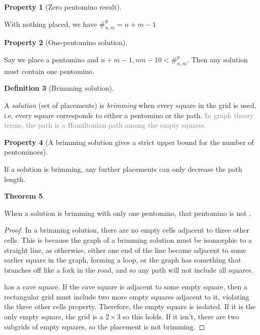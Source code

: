 \documentclass{article}
\newcommand{\pentU}{\smash{\colorbox{colorU!50}{U}}}
\theoremstyle{definition}%
\newtheorem{theorem}{Theorem}[section]
\newtheorem{definition}[theorem]{Definition}
\newtheorem{property}[theorem]{Property}
\newcommand{\minordetail}[1]{\textcolor{gray}{#1}}
\newcommand{\newterm}[1]{\textit{#1}}
\begin{document}
\begin{property}[Zero pentomino result]
\label{prop:zeroplace}

With nothing placed, we have $\#^{\emptyset}_{n, m} = n + m - 1$
\end{property}

\begin{property}[One-pentomino solution]
\label{prop:oneplace}

Say we place a pentomino and $n + m - 1, nm - 10 < \#^p_{n, m}$. Then any solution must contain one pentomino.
\end{property}

\begin{definition}[Brimming solution]
\label{def:brimming}

A \newterm{solution} (set of placements) is \newterm{brimming} when every square in the grid is used, i.e, every square corresponds to either a pentomino or the path. \minordetail{In graph theory terms, the path is a Hamiltonian path among the empty squares.}
\end{definition}

\begin{property}[A brimming solution gives a strict upper bound for the number of pentominoes]
\label{prop:brimmax}

If a solution is brimming, any further placements can only decrease the path length.
\end{property}

\begin{theorem}
\label{th:brimming1u}

When a solution is brimming with only one pentomino, that pentomino is not \pentU.
\end{theorem}

\begin{proof}
In a brimming solution, there are no empty cells adjacent to three other cells. This is because the graph of a brimming solution must be isomorphic to a straight line, as otherwise, either one end of the line became adjacent to some earlier square in the graph, forming a loop, or the graph has something that branches off like a fork in the road, and so any path will not include all squares.

\pentU{} has a cave square. If the cave square is adjacent to some empty square, then a rectangular grid must include two more empty squares adjacent to it, violating the three other cells property. Therefore, the empty square is isolated. If it is the only empty square, the grid is a $2 \times 3$ so this holds. If it isn't, there are two subgrids of empty squares, so the placement is not brimming.
\end{proof}
\end{document}
